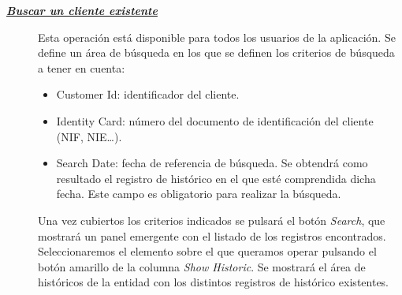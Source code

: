 \begin{description}
\item[\underline{\textsl{\textbf{Buscar un cliente existente}}}] Esta operación está disponible para todos los usuarios de la aplicación.
Se define un área de búsqueda en los que se definen los criterios de búsqueda a tener en cuenta:
\begin{itemize}
\item Customer Id: identificador del cliente.
\item Identity Card: número del documento de identificación del cliente (NIF, NIE\dots).
\item Search Date: fecha de referencia de búsqueda. Se obtendrá como resultado el registro de histórico en el que esté comprendida dicha fecha. Este campo es obligatorio para realizar la búsqueda.
\end{itemize}

Una vez cubiertos los criterios indicados se pulsará el botón \emph{Search}, que mostrará un panel emergente con el listado de los registros encontrados. Seleccionaremos el elemento sobre el que queramos operar pulsando el botón amarillo de la columna \emph{Show Historic}. Se mostrará el área de históricos de la entidad con los distintos registros de histórico existentes.


\end{description}
